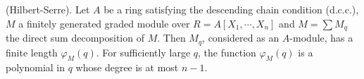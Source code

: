 (Hilbert-Serre). Let $A$ be a ring satisfying the descending chain condition (d.c.c.), $M$ a finitely generated graded module over $R = A[X_1, \cdots, X_n]$ and $M = \sum M_q$ the direct sum decomposition of $M$. Then $M_q$, considered as an $A$-module, has a finite length $\varphi_M(q)$. For sufficiently large $q$, the function $\varphi_M(q)$ is a polynomial in $q$ whose degree is at most $n - 1$.